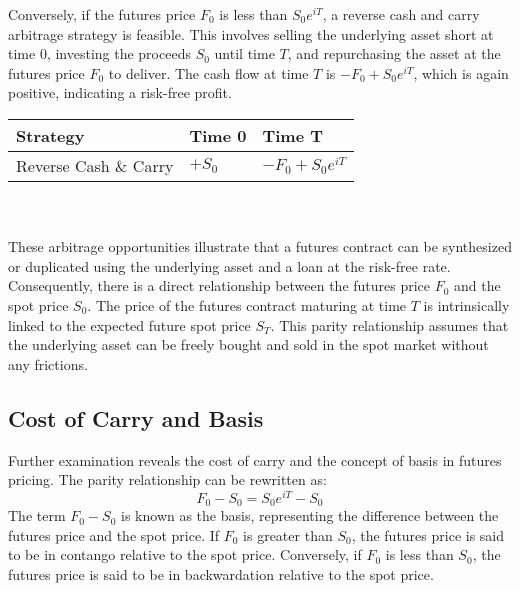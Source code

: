 \documentclass[a4paper,10pt]{article}
\begin{document}
        \noindent Conversely, if the futures price \( F_0 \) is less than \( S_0 e^{iT} \), a reverse cash and carry arbitrage strategy is feasible. This involves selling the underlying asset short at time 0, investing the proceeds \( S_0 \) until time \( T \), and repurchasing the asset at the futures price \( F_0 \) to deliver. The cash flow at time \( T \) is \( -F_0 + S_0 e^{iT} \), which is again positive, indicating a risk-free profit. \\

        \noindent\begin{tabularx}{\textwidth}{|Y|Y|Y|}
            \hline
            \textbf{Strategy} & \textbf{Time 0} & \textbf{Time T} \\ \hline
            Reverse Cash \& Carry & \( +S_0 \)  & \( -F_0 + S_0 e^{iT} \) \\ \hline
        \end{tabularx}\\\\

        \noindent These arbitrage opportunities illustrate that a futures contract can be synthesized or duplicated using the underlying asset and a loan at the risk-free rate. Consequently, there is a direct relationship between the futures price \( F_0 \) and the spot price \( S_0 \). The price of the futures contract maturing at time \( T \) is intrinsically linked to the expected future spot price \( S_T \). This parity relationship assumes that the underlying asset can be freely bought and sold in the spot market without any frictions. \\


    \subsection*{Cost of Carry and Basis}

        \noindent Further examination reveals the cost of carry and the concept of basis in futures pricing. The parity relationship can be rewritten as:
        \[ F_0 - S_0 = S_0 e^{iT} - S_0 \]
        The term \( F_0 - S_0 \) is known as the basis, representing the difference between the futures price and the spot price. If \( F_0 \) is greater than \( S_0 \), the futures price is said to be in contango relative to the spot price. Conversely, if \( F_0 \) is less than \( S_0 \), the futures price is said to be in backwardation relative to the spot price.\\
        
\end{document}
